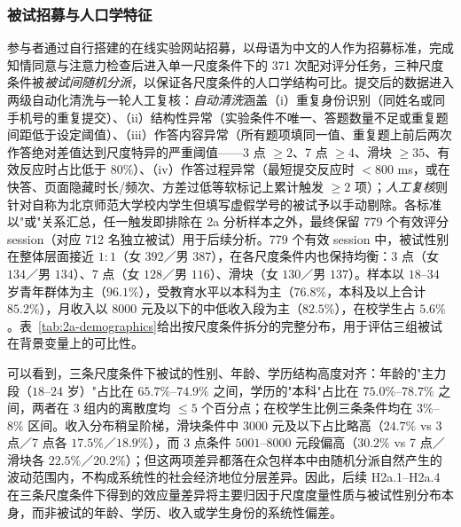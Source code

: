 \documentclass[UTF8,12pt]{ctexart}
\begin{document}
\subsubsection{被试招募与人口学特征}
\label{subsubsec:2a-participants}

参与者通过自行搭建的在线实验网站招募，以母语为中文的人作为招募标准，完成知情同意与注意力检查后进入单一尺度条件下的 371 次配对评分任务，三种尺度条件被\emph{被试间随机分派}，以保证各尺度条件的人口学结构可比。提交后的数据进入两级自动化清洗与一轮人工复核：\emph{自动清洗}涵盖（i）重复身份识别（同姓名或同手机号的重复提交）、（ii）结构性异常（实验条件不唯一、答题数量不足或重复题间距低于设定阈值）、（iii）作答内容异常（所有题项填同一值、重复题上前后两次作答绝对差值达到尺度特异的严重阈值——3 点 $\geq 2$、7 点 $\geq 4$、滑块 $\geq 35$、有效反应时占比低于 $80\%$）、（iv）作答过程异常（最短提交反应时 $< 800$ ms，或在快答、页面隐藏时长/频次、方差过低等软标记上累计触发 $\geq 2$ 项）；\emph{人工复核}则针对自称为北京师范大学校内学生但填写虚假学号的被试予以手动剔除。各标准以"或"关系汇总，任一触发即排除在 2a 分析样本之外，最终保留 779 个有效评分 session（对应 712 名独立被试）用于后续分析。779 个有效 session 中，被试性别在整体层面接近 $1\!:\!1$（女 $392$／男 $387$），在各尺度条件内也保持均衡：3 点（女 $134$／男 $134$）、7 点（女 $128$／男 $116$）、滑块（女 $130$／男 $137$）。样本以 $18$--$34$ 岁青年群体为主（$96.1\%$），受教育水平以本科为主（$76.8\%$，本科及以上合计 $85.2\%$），月收入以 $8000$ 元及以下的中低收入段为主（$82.5\%$），在校学生占 $5.6\%$。表~\ref{tab:2a-demographics}给出按尺度条件拆分的完整分布，用于评估三组被试在背景变量上的可比性。

可以看到，三条尺度条件下被试的性别、年龄、学历结构高度对齐：年龄的"主力段（$18$--$24$ 岁）"占比在 $65.7\%$--$74.9\%$ 之间，学历的"本科"占比在 $75.0\%$--$78.7\%$ 之间，两者在 3 组内的离散度均 $\leq 5$ 个百分点；在校学生比例三条条件均在 $3\%$--$8\%$ 区间。收入分布稍呈阶梯，滑块条件中 $3000$ 元及以下占比略高（$24.7\%$ vs 3 点／7 点各 $17.5\%$／$18.9\%$），而 3 点条件 $5001$--$8000$ 元段偏高（$30.2\%$ vs 7 点／滑块各 $22.5\%$／$20.2\%$）；但这两项差异都落在众包样本中由随机分派自然产生的波动范围内，不构成系统性的社会经济地位分层差异。因此，后续 H2a.1--H2a.4 在三条尺度条件下得到的效应量差异将主要归因于尺度度量性质与被试性别分布本身，而非被试的年龄、学历、收入或学生身份的系统性偏差。
\end{document}
